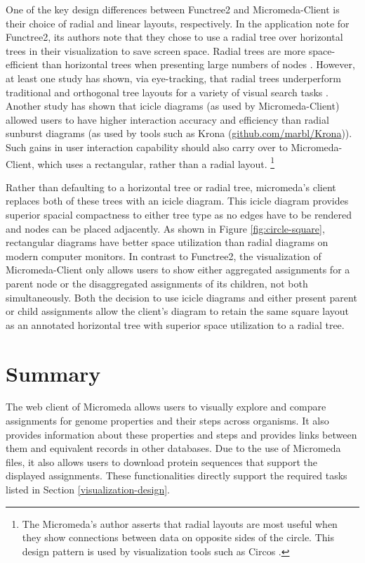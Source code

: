 One of the key design differences between Functree2 and Micromeda-Client is their choice of radial and linear layouts, respectively. In the application note for Functree2, its authors note that they chose to use a radial tree over horizontal trees in their visualization to save screen space. Radial trees are more space-efficient than horizontal trees when presenting large numbers of nodes \cite{burch2011evaluation}. However, at least one study has shown, via eye-tracking, that radial trees underperform traditional and orthogonal tree layouts for a variety of visual search tasks \cite{burch2011evaluation}. Another study has shown that icicle diagrams (as used by Micromeda-Client) allowed users to have higher interaction accuracy and efficiency \cite{muramalla2017radial} than radial sunburst diagrams (as used by tools such as Krona \cite{ondov2011interactive} (\href{github.com/marbl/Krona}{github.com/marbl/Krona})).
Such gains in user interaction capability should also carry over to Micromeda-Client, which uses a rectangular, rather than a radial layout. \footnote{The Micromeda's author asserts that radial layouts are most useful when they show connections between data on opposite sides of the circle. This design pattern is used by visualization tools such as Circos \cite{krzywinski2009circos}.} 

Rather than defaulting to a horizontal tree or radial tree, micromeda's client replaces both of these trees with an icicle diagram. This icicle diagram provides superior spacial compactness to either tree type as no edges have to be rendered and nodes can be placed adjacently. As shown in Figure \ref{fig:circle-square}, rectangular diagrams have better space utilization than radial diagrams on modern computer monitors. In contrast to Functree2, the visualization of Micromeda-Client only allows users to show either aggregated assignments for a parent node or the disaggregated assignments of its children, not both simultaneously. Both the decision to use icicle diagrams and either present parent or child assignments allow the client's diagram to retain the same square layout as an annotated horizontal tree with superior space utilization to a radial tree. 

\section{Summary} \label{micromeda-client-summary}

The web client of Micromeda allows users to visually explore and compare assignments for genome properties and their steps across organisms. It also provides information about these properties and steps and provides links between them and equivalent records in other databases. Due to the use of Micromeda files, it also allows users to download protein sequences that support the displayed assignments. These functionalities directly support the required tasks listed in Section \ref{visualization-design}.

